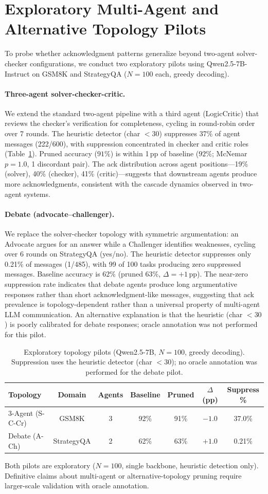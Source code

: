 \section{Exploratory Multi-Agent and Alternative Topology Pilots}
\label{app:multiagent}

To probe whether acknowledgment patterns generalize beyond two-agent solver-checker configurations, we conduct two exploratory pilots using Qwen2.5-7B-Instruct on GSM8K and StrategyQA ($N = 100$ each, greedy decoding).

\paragraph{Three-agent solver-checker-critic.}
We extend the standard two-agent pipeline with a third agent (LogicCritic) that reviews the checker's verification for completeness, cycling in round-robin order over 7 rounds. The heuristic detector (char $< 30$) suppresses 37\% of agent messages (222/600), with suppression concentrated in checker and critic roles (Table~\ref{tab:pilot_results}). Pruned accuracy ($91\%$) is within 1\,pp of baseline ($92\%$; McNemar $p = 1.0$, 1 discordant pair). The ack distribution across agent positions---19\% (solver), 40\% (checker), 41\% (critic)---suggests that downstream agents produce more acknowledgments, consistent with the cascade dynamics observed in two-agent systems.

\paragraph{Debate (advocate--challenger).}
We replace the solver-checker topology with symmetric argumentation: an Advocate argues for an answer while a Challenger identifies weaknesses, cycling over 6 rounds on StrategyQA (yes/no). The heuristic detector suppresses only 0.21\% of messages (1/485), with 99 of 100 tasks producing zero suppressed messages. Baseline accuracy is 62\% (pruned 63\%, $\Delta = +1$\,pp). The near-zero suppression rate indicates that debate agents produce long argumentative responses rather than short acknowledgment-like messages, suggesting that ack prevalence is topology-dependent rather than a universal property of multi-agent LLM communication. An alternative explanation is that the heuristic (char $< 30$) is poorly calibrated for debate responses; oracle annotation was not performed for this pilot.

\begin{table}[ht]
\centering
\caption{Exploratory topology pilots (Qwen2.5-7B, $N = 100$, greedy decoding). Suppression uses the heuristic detector (char $< 30$); no oracle annotation was performed for the debate pilot.}
\label{tab:pilot_results}
\small
\begin{tabular}{lcccccc}
\toprule
Topology & Domain & Agents & Baseline & Pruned & $\Delta$ (pp) & Suppress \% \\
\midrule
3-Agent (S-C-Cr) & GSM8K & 3 & 92\% & 91\% & $-1.0$ & 37.0\% \\
Debate (A-Ch) & StrategyQA & 2 & 62\% & 63\% & $+1.0$ & 0.21\% \\
\bottomrule
\end{tabular}
\end{table}

Both pilots are exploratory ($N = 100$, single backbone, heuristic detection only). Definitive claims about multi-agent or alternative-topology pruning require larger-scale validation with oracle annotation.
